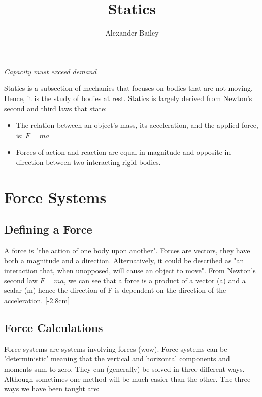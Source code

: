 \documentclass[a4paper, 12pt]{article}
\begin{document}
\title{Statics}
\author{Alexander Bailey}
\maketitle
\begin{center}
\textit{Capacity must exceed demand}
\end{center}
Statics is a subsection of mechanics that focuses on bodies that are not moving.
Hence, it is the study of bodies at rest.
Statics is largely derived from Newton's second and third laws that state:

\begin{itemize}
    \item The relation between an object's mass, its acceleration, and the applied force, is: $F=ma$
    \item Forces of action and reaction are equal in magnitude and opposite in direction between two interacting rigid bodies.
\end{itemize}

\section{Force Systems}
\subsection{Defining a Force}
A force is "the action of one body upon another". Forces are vectors, they have both a magnitude and a direction.
Alternatively, it could be described as "an interaction that, when unopposed, will cause an object to move". 
From Newton's second law $F=ma$, we can see that a force is a product of a vector (a) and a scalar (m) hence
the direction of F is dependent on the direction of the acceleration. 
[-2.8cm]
\subsection{Force Calculations}
Force systems are systems involving forces (wow). Force systems can be 'deterministic' meaning that the vertical and horizontal components and moments sum to zero.
They can (generally) be solved in three different ways.
Although sometimes one method will be much easier than the other. The three ways we have been taught are:
\end{document}

